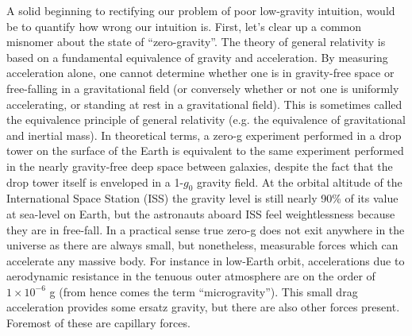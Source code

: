 \documentclass[12pt,a4paper,oneside]{book}
\begin{document}
A solid beginning to rectifying our problem of poor low-gravity intuition, would be to quantify how wrong our intuition is. First, let's clear up a common misnomer about the state of ``zero-gravity''. The theory of general relativity is based on a fundamental equivalence of gravity and acceleration. By measuring acceleration alone, one cannot determine whether one is in gravity-free space or free-falling in a gravitational field (or conversely whether or not one is uniformly accelerating, or standing at rest in a gravitational field). This is sometimes called the equivalence principle of general relativity (e.g. the equivalence of gravitational and inertial mass). In theoretical terms, a zero-g experiment performed in a drop tower on the surface of the Earth is equivalent to the same experiment performed in the nearly gravity-free deep space between galaxies, despite the fact that the drop tower itself is enveloped in a 1-$g_0$ gravity field. At the orbital altitude of the International Space Station (ISS) the gravity level is still nearly 90\% of its value at sea-level on Earth, but the astronauts aboard ISS feel weightlessness because they are in free-fall. In a practical sense true zero-g does not exit anywhere in the universe as there are always small, but nonetheless, measurable forces which can accelerate any massive body. For instance in low-Earth orbit, accelerations due to aerodynamic resistance in the tenuous outer atmosphere are on the order of $1 \times 10^{-6}$ g (from hence comes the term ``microgravity''). This small drag acceleration provides some ersatz gravity, but there are also other forces present. Foremost of these are capillary forces. 
\end{document}

